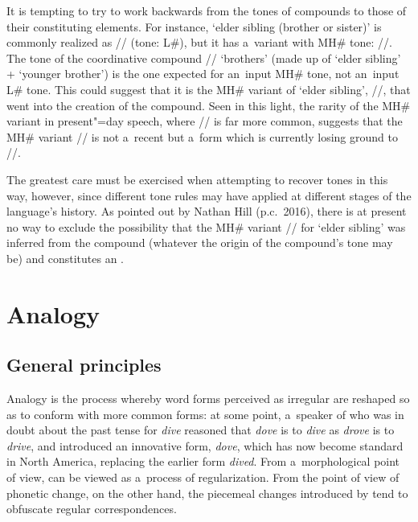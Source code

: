 It is tempting to try to work backwards from the tones of compounds to those of their constituting elements. For
instance, ‘elder sibling (brother or sister)’ is commonly realized as // (tone: L\#), but
it has a~variant with MH\# tone: //. The tone of the coordinative compound
// ‘brothers’ (made up of ‘elder sibling’ + ‘younger brother’) is the one
expected for an~input MH\# tone, not an~input L\# tone. This could suggest
that it is the MH\# variant of ‘elder sibling’, //, that went into the creation of the compound. Seen in this light,
the rarity of the MH\# variant in present"=day speech, where // is far more common, suggests
that the MH\# variant // is not a~recent  but a~form which is currently losing ground to
//.

The greatest care must be exercised when attempting to recover tones in this way, however, since different tone rules may have applied at different stages of the language’s history. As pointed out by Nathan Hill (p.c.\ 2016), there is at present no way to exclude the possibility that the MH\# variant // for ‘elder sibling’ was inferred from the compound (whatever the origin of the compound's tone may be) and constitutes an . 


\section{Analogy}
\label{sec:analogy}

\subsection{General principles}
\label{sec:generalprinciples}

Analogy is the process whereby word forms perceived as irregular are reshaped so as to conform with more
common forms: at some point, a~speaker of  who was in doubt about the past tense for \textit{dive} reasoned that \textit{dove} is to \textit{dive} as \textit{drove} is to \textit{drive}, and introduced an innovative form, \textit{dove}, which has now become standard in North America, replacing the earlier form \textit{dived}. From a~morphological point of view,  can be viewed as a~process of
regularization. From the point of view of phonetic change, on the other hand, the piecemeal changes
introduced by  tend to obfuscate regular correspondences.

